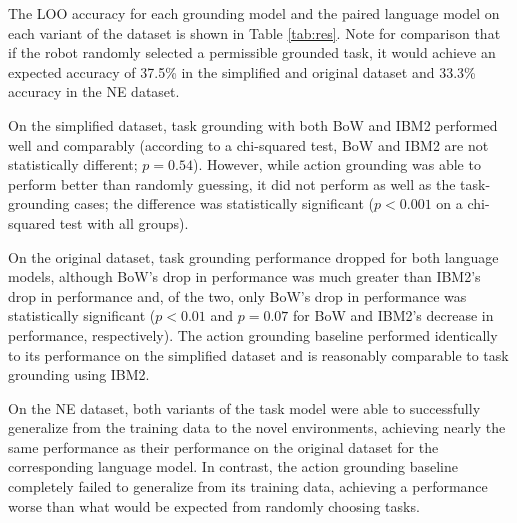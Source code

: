 \documentclass[conference]{IEEEtran}
\begin{document}


The LOO accuracy for each grounding model 
and the paired language model 
on each variant of the dataset is shown in Table \ref{tab:res}. Note for comparison that if the robot randomly selected a permissible grounded task, it would achieve an expected accuracy of 37.5\% in the simplified and original dataset and 33.3\% accuracy in the NE dataset. 


On the simplified dataset, task grounding with both BoW and IBM2 performed well and comparably (according to a chi-squared test, BoW and IBM2 are not statistically different; $p = 0.54$). However, while action grounding was able to perform better than randomly guessing, it did not perform as well as the task-grounding cases; the difference was statistically significant ($p < 0.001$ on a chi-squared test with all groups).

On the original dataset, task grounding performance dropped for both language models, although BoW's drop in performance was much greater than IBM2's drop in performance and, of the two, only BoW's drop in performance was statistically significant ($p < 0.01$ and $p = 0.07$ for BoW and IBM2's decrease in performance, respectively). The action grounding baseline performed identically to its performance on the simplified dataset and is reasonably comparable to task grounding using IBM2.

On the NE dataset, both variants of the task model were able to successfully generalize from the training data to the novel environments, achieving nearly the same performance as their performance on the original dataset for the corresponding language model.
In contrast, the action grounding baseline completely failed to generalize from its training data, achieving a performance worse than what would be expected from randomly choosing tasks.
\end{document}
